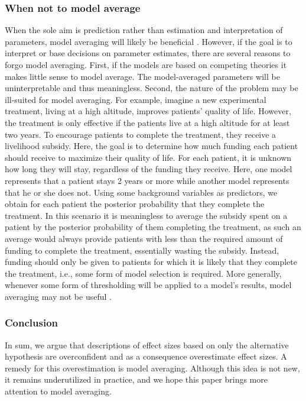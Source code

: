 \documentclass[a4paper]{article}
\begin{document}
\subsubsection*{When not to model average}
When the sole aim is prediction rather than estimation and interpretation of parameters, model averaging will likely be beneficial \cite<but see>{grunwald2017inconsistency, minka2000bayesian}. However, if the goal is to interpret or base decisions on parameter estimates, there are several reasons to forgo model averaging. First, if the models are based on competing theories it makes little sense to model average. The model-averaged parameters will be uninterpretable and thus meaningless. Second, the nature of the problem may be ill-suited for model averaging. For example, imagine a new experimental treatment, living at a high altitude, improves patients' quality of life. However, the treatment is only effective if the patients live at a high altitude for at least two years. To encourage patients to complete the treatment, they receive a livelihood subsidy. Here, the goal is to determine how much funding each patient should receive to maximize their quality of life. For each patient, it is unknown how long they will stay, regardless of the funding they receive. Here, one model represents that a patient stays 2 years or more while another model represents that he or she does not. Using some background variables as predictors, we obtain for each patient the posterior probability that they complete the treatment. In this scenario it is meaningless to average the subsidy spent on a patient by the posterior probability of them completing the treatment, as such an average would always provide patients with less than the required amount of funding to complete the treatment, essentially wasting the subsidy. Instead, funding should only be given to patients for which it is likely that they complete the treatment, i.e., some form of model selection is required. More generally, whenever some form of thresholding will be applied to a model's results, model averaging may not be useful \cite<see also>{HaafEtAl2019Nature}.

\subsubsection*{Conclusion}
In sum, we argue that descriptions of effect sizes based on only the alternative hypothesis are overconfident and as a consequence overestimate effect sizes. A remedy for this overestimation is model averaging. Although this idea is not new, it remains underutilized in practice, and we hope this paper brings more attention to model averaging.
\end{document}
